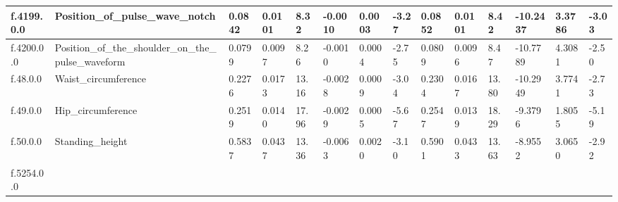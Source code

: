 \begin{longtable}{llllllllllllll}
\multicolumn{1}{|l|}{f.4199.0.0} &
  \multicolumn{1}{l|}{Position\_of\_pulse\_wave\_notch} &
  \multicolumn{1}{l|}{0.0842} &
  \multicolumn{1}{l|}{0.0101} &
  \multicolumn{1}{l|}{8.32} &
  \multicolumn{1}{l|}{-0.0010} &
  \multicolumn{1}{l|}{0.0003} &
  \multicolumn{1}{l|}{-3.27} &
  \multicolumn{1}{l|}{0.0852} &
  \multicolumn{1}{l|}{0.0101} &
  \multicolumn{1}{l|}{8.42} &
  \multicolumn{1}{l|}{-10.2437} &
  \multicolumn{1}{l|}{3.3786} &
  \multicolumn{1}{l|}{-3.03} \\ \hline
\multicolumn{1}{|l|}{f.4200.0.0} &
  \multicolumn{1}{l|}{Position\_of\_the\_shoulder\_on\_the\_pulse\_waveform} &
  \multicolumn{1}{l|}{0.0799} &
  \multicolumn{1}{l|}{0.0097} &
  \multicolumn{1}{l|}{8.26} &
  \multicolumn{1}{l|}{-0.0010} &
  \multicolumn{1}{l|}{0.0004} &
  \multicolumn{1}{l|}{-2.75} &
  \multicolumn{1}{l|}{0.0809} &
  \multicolumn{1}{l|}{0.0096} &
  \multicolumn{1}{l|}{8.47} &
  \multicolumn{1}{l|}{-10.7789} &
  \multicolumn{1}{l|}{4.3081} &
  \multicolumn{1}{l|}{-2.50} \\ \hline
\multicolumn{1}{|l|}{f.48.0.0} &
  \multicolumn{1}{l|}{Waist\_circumference} &
  \multicolumn{1}{l|}{0.2276} &
  \multicolumn{1}{l|}{0.0173} &
  \multicolumn{1}{l|}{13.16} &
  \multicolumn{1}{l|}{-0.0028} &
  \multicolumn{1}{l|}{0.0009} &
  \multicolumn{1}{l|}{-3.04} &
  \multicolumn{1}{l|}{0.2304} &
  \multicolumn{1}{l|}{0.0167} &
  \multicolumn{1}{l|}{13.80} &
  \multicolumn{1}{l|}{-10.2949} &
  \multicolumn{1}{l|}{3.7741} &
  \multicolumn{1}{l|}{-2.73} \\ \hline
\multicolumn{1}{|l|}{f.49.0.0} &
  \multicolumn{1}{l|}{Hip\_circumference} &
  \multicolumn{1}{l|}{0.2519} &
  \multicolumn{1}{l|}{0.0140} &
  \multicolumn{1}{l|}{17.96} &
  \multicolumn{1}{l|}{-0.0029} &
  \multicolumn{1}{l|}{0.0005} &
  \multicolumn{1}{l|}{-5.67} &
  \multicolumn{1}{l|}{0.2547} &
  \multicolumn{1}{l|}{0.0139} &
  \multicolumn{1}{l|}{18.29} &
  \multicolumn{1}{l|}{-9.3796} &
  \multicolumn{1}{l|}{1.8055} &
  \multicolumn{1}{l|}{-5.19} \\ \hline
\multicolumn{1}{|l|}{f.50.0.0} &
  \multicolumn{1}{l|}{Standing\_height} &
  \multicolumn{1}{l|}{0.5837} &
  \multicolumn{1}{l|}{0.0437} &
  \multicolumn{1}{l|}{13.36} &
  \multicolumn{1}{l|}{-0.0063} &
  \multicolumn{1}{l|}{0.0020} &
  \multicolumn{1}{l|}{-3.10} &
  \multicolumn{1}{l|}{0.5901} &
  \multicolumn{1}{l|}{0.0433} &
  \multicolumn{1}{l|}{13.63} &
  \multicolumn{1}{l|}{-8.9552} &
  \multicolumn{1}{l|}{3.0650} &
  \multicolumn{1}{l|}{-2.92} \\ \hline
\multicolumn{1}{|l|}{f.5254.0.0} &

\end{longtable}
